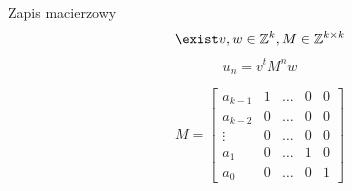 \documentclass[handout]{beamer}
\theoremstyle{definition}
\theoremstyle{named}
\begin{document}
\begin{frame}{Zapis macierzowy}
    $$\exist v, w \in \mathbb{Z}^{k}, M \in \mathbb{Z}^{k\times k} $$
    $$u_n = v^{t}M^{n}w$$

    \begin{equation*}
    
        M = \begin{bmatrix}
        a_{k-1} & 1 & \ldots & 0 & 0 \\
        a_{k-2} & 0 & \ldots & 0 & 0 \\
        \vdots & 0 & \ldots & 0 & 0 \\ 
        a_1 & 0 & \ldots & 1 & 0 \\
        a_0 & 0 & \ldots & 0 & 1
        \end{bmatrix}
    \end{equation*}
\end{frame}
\end{document}
